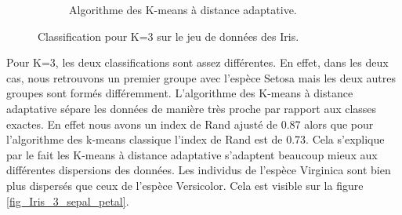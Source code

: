 \documentclass[a4paper,11pt,oneside,roman]{article}
\begin{document}
\begin{figure}
\begin{subfigure}{.5\textwidth}
          \caption{Algorithme des K-means à distance adaptative.}
        \end{subfigure}
        \caption{Classification pour K=3 sur le jeu de données des Iris.}
        \label{fig_Iris_3}
    \end{figure}

    Pour K=3, les deux classifications sont assez différentes.
    En effet, dans les deux cas, nous retrouvons un premier groupe avec l'espèce Setosa mais les deux autres groupes sont formés différemment.
    L'algorithme des K-means à distance adaptative sépare les données de manière très proche par rapport aux classes exactes.
    En effet nous avons un index de Rand ajusté de 0.87 alors que pour l'algorithme des k-means classique l'index de Rand est de 0.73.
    Cela s'explique par le fait les K-means à distance adaptative s'adaptent beaucoup mieux aux différentes dispersions des données.
    Les individus de l'espèce Virginica sont bien plus dispersés que ceux de l'espèce Versicolor. Cela est visible sur la figure \ref{fig_Iris_3_sepal_petal}.
\end{document}
